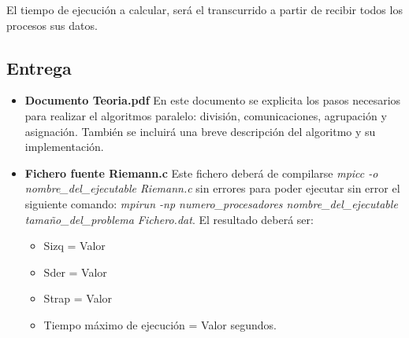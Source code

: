 \newpage \documentclass[a4paper,10pt]{article}
\begin{document}
El tiempo de ejecución a calcular, será el transcurrido a partir de recibir todos los procesos sus datos.\\

\subsection{Entrega}

\begin{itemize}
\item \textbf{Documento Teoria.pdf} En este documento se explicita los pasos necesarios para realizar el algoritmos paralelo: división, comunicaciones, agrupación y asignación. También se incluirá una breve descripción del algoritmo y su implementación.

\item \textbf{Fichero fuente Riemann.c}  Este fichero deberá de compilarse \textit{mpicc -o nombre\_del\_ejecutable Riemann.c}  sin errores para poder ejecutar sin error el siguiente comando: \textit{mpirun -np numero\_procesadores nombre\_del\_ejecutable tamaño\_del\_problema Fichero.dat}. El resultado deberá ser:
\begin{itemize}
\item Sizq = Valor
\item  Sder = Valor
\item  Strap = Valor
\item  Tiempo máximo de ejecución = Valor segundos.
\end{itemize}

\end{itemize}


\end{document}
